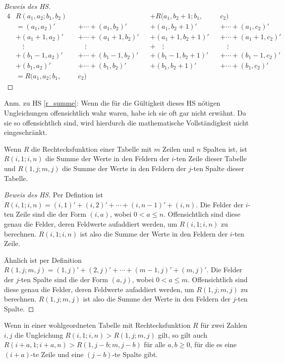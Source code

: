 \begin{proof}[Beweis des HS]
\begin{alignat*}{4}
        &R(a_1, a_2; b_1, b_2)&& &&+R(a_1, b_2+1; b_1, &&c_2)\\
        &=(a_1, a_2)' &&+\cdots+ (a_1, b_2)'
        &&+(a_1, b_2+1)'&&+\cdots+(a_1, c_2)'\\
        &+(a_1+1, a_2)'&&+\cdots+ (a_1+1, b_2)'
        &&+(a_1+1, b_2+1)'&&+\cdots+(a_1+1, c_2)'\\
        & \quad\vdots&&\quad\vdots&&+\quad\vdots&&\quad\vdots\\
        &+(b_1-1, a_2)'&&+\cdots + (b_1-1, b_2)'
        &&+(b_1-1, b_2+1)'&&+\cdots+(b_1-1, c_2)'\\
        &+(b_1, a_2)'&&+ \cdots + (b_1, b_2)'
        &&+(b_1, b_2+1)'&&+\cdots+(b_1, c_2)'\\
        &=R(a_1, a_2; b_1, &&c_2)
    \end{alignat*}
\end{proof}
Anm.  zu HS \ref{r_summe}: Wenn die für die Gültigkeit dieses HS nötigen Ungleichungen offensichtlich wahr waren, 
habe ich sie oft gar nicht erwähnt. Da sie so offensichtlich sind, wird hierdurch die mathematische Vollständigkeit 
nicht eingeschränkt.
\begin{lem}\label{r_zeile_spalte}
    Wenn $R$ die Rechtecksfunktion einer Tabelle mit $m$ Zeilen und $n$ Spalten ist, ist $R(i, 1; i, n)$ die Summe 
    der Werte in den Feldern der $i$-ten Zeile dieser Tabelle und $R(1, j; m, j)$ die Summe der Werte in den Feldern 
    der $j$-ten Spalte dieser Tabelle.
\end{lem}
\begin{proof}[Beweis des HS]
    Per Defintion ist $R(i, 1; i, n)=(i, 1)'+(i, 2)'+\cdots+(i, n-1)'+(i, n)$. Die Felder der $i$-ten Zeile sind die 
    der Form $(i, a)$, wobei $0<a\leq n$. Offensichtlich sind diese genau die Felder, deren Feldwerte aufaddiert 
    werden, um $R(i, 1; i, n)$ zu berechnen. $R(i, 1; i, n)$ ist also die Summe der Werte in den Feldern der $i$-ten 
    Zeile.

    Ähnlich ist per Definition $R(1, j; m, j)=(1, j)'+(2, j)'+\cdots+(m-1, j)'+(m, j)'$. Die Felder der $j$-ten Spalte 
    sind die der Form $(a, j)$, wobei $0<a\leq m$. Offensichtlich sind diese genau die Felder, deren Feldwerte 
    aufaddiert werden, um $R(1, j; m, j)$ zu berechnen. $R(1, j; m, j)$ ist also die Summe der Werte in den Feldern 
    der $j$-ten Spalte.
\end{proof}
\begin{lem}\label{mehr_nuller}
    Wenn in einer wohlgeordneten Tabelle mit Rechtecksfunktion $R$ für zwei Zahlen $i, j$ die Ungleichung 
    $R(i, 1; i, n)>R(1, j; m, j)$ gilt, so gilt auch $R(i+a, 1; i+a, n)>R(1, j-b; m, j-b)$ für alle $a, b\geq0$, für 
    die es eine $(i+a)$-te Zeile und eine $(j-b)$-te Spalte gibt.
\end{lem}
